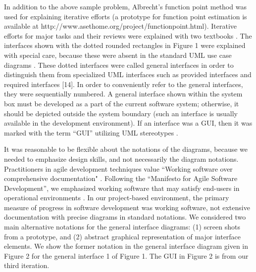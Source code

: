 \documentclass{article}
\begin{document}
In addition to the above sample problem, Albrecht’s function point method \cite{albrecht} was used for explaining iterative efforts (a prototype for function point estimation is available at http://www.asethome.org/project/functionpoint.html). Iterative efforts for major tasks and their reviews were explained with two textbooks \cite{kung, pressman}.  The interfaces shown with the dotted rounded rectangles in Figure 1 were explained with special care, because these were absent in the standard UML use case diagrams \cite{pressman, rumbaugh}. These dotted interfaces were called general interfaces in order to distinguish them from specialized UML interfaces such as provided interfaces and required interfaces [14]. In order to conveniently refer to the general interfaces, they were sequentially numbered. A general interface shown within the system box must be developed as a part of the current software system; otherwise, it should be depicted outside the system boundary (such an interface is usually available in the development environment). If an interface was a GUI, then it was marked with the term “GUI” utilizing UML stereotypes \cite{rumbaugh}.   

It was reasonable to be flexible about the notations of the diagrams, because we needed to emphasize design skills, and not necessarily the diagram notations. Practitioners in agile development techniques value ``Working software over comprehensive documentation" \cite{beck}.  Following the “Manifesto for Agile Software Development”, we emphasized working software that may satisfy end-users in operational 
environments \cite{beck}. In our project-based environment, the primary measure of progress in software development was working software, not extensive documentation with precise diagrams in standard notations. We considered two main alternative notations for the general interface diagrams: (1) screen shots from a prototype, and (2) abstract graphical representation of major interface elements. We show the former notation in the general interface diagram given in Figure 2 for the general interface 1 of Figure 1.  The GUI in Figure 2 is from our third iteration.   
\end{document}
